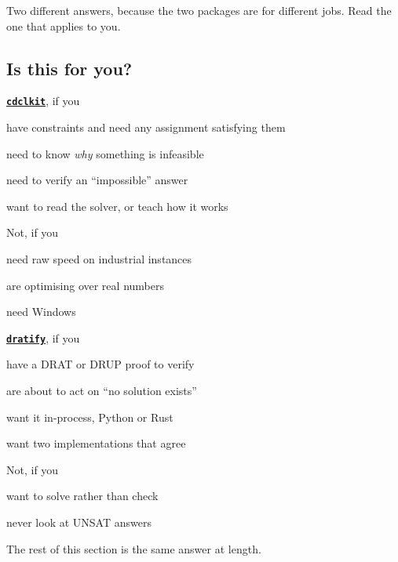 \documentclass[11pt,a4paper]{article}
\newcommand{\yes}{\textcolor{yes}{\ding{51}}}
\newcommand{\nope}{\textcolor{no}{\ding{55}}}
\newcommand{\pkg}[1]{\href{https://pypi.org/project/#1/}{\texttt{#1}}}
\begin{document}
Two different answers, because the two packages are for different jobs. Read
the one that applies to you.

\subsection*{Is this for you?}

\begin{minipage}[t]{0.485\linewidth}
\textbf{\pkg{cdclkit}}, if you
\begin{fit}
\item[\yes] have constraints and need any assignment satisfying them
\item[\yes] need to know \emph{why} something is infeasible
\item[\yes] need to verify an ``impossible'' answer
\item[\yes] want to read the solver, or teach how it works
\end{fit}
\vspace{0.6ex}
Not, if you
\begin{fit}
\item[\nope] need raw speed on industrial instances
\item[\nope] are optimising over real numbers
\item[\nope] need Windows
\end{fit}
\end{minipage}\hfill
\begin{minipage}[t]{0.485\linewidth}
\textbf{\pkg{dratify}}, if you
\begin{fit}
\item[\yes] have a DRAT or DRUP proof to verify
\item[\yes] are about to act on ``no solution exists''
\item[\yes] want it in-process, Python or Rust
\item[\yes] want two implementations that agree
\end{fit}
\vspace{0.6ex}
Not, if you
\begin{fit}
\item[\nope] want to solve rather than check
\item[\nope] never look at UNSAT answers
\end{fit}
\end{minipage}

\vspace{1.2ex}
The rest of this section is the same answer at length.
\end{document}
